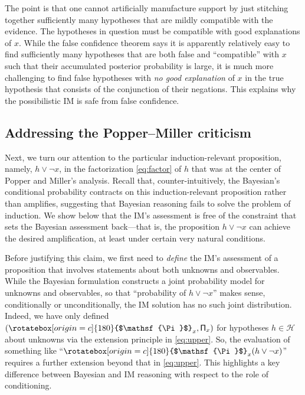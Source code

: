 \documentclass[a4paper, 12pt]{article}
\theoremstyle{plain}
\theoremstyle{definition}
\theoremstyle{remark}
\renewcommand{\H}{\mathcal{H}}
\newcommand{\lPi}{\rotatebox[origin=c]{180}{$\mathsf{\Pi}$}} %
\newcommand{\uPi}{\mathsf{\Pi}}%
\begin{document}
The point is that one cannot artificially manufacture support by just stitching together sufficiently many hypotheses that are mildly compatible with the evidence.  The hypotheses in question must be compatible with good explanations of $x$.  While the false confidence theorem says it is apparently relatively easy to find sufficiently many hypotheses that are both false and ``compatible'' with $x$ such that their accumulated posterior probability is large, it is much more challenging to find false hypotheses with {\em no good explanation} of $x$ in the true hypothesis that consists of the conjunction of their negations.  This explains why the possibilistic IM is safe from false confidence.  


\subsection{Addressing the Popper--Miller criticism}
\label{SS:pm}

Next, we turn our attention to the particular induction-relevant proposition, namely, $h \lor \neg x$, in the factorization \eqref{eq:factor} of $h$ that was at the center of Popper and Miller's analysis.  Recall that, counter-intuitively, the Bayesian's conditional probability contracts on this induction-relevant proposition rather than amplifies, suggesting that Bayesian reasoning fails to solve the problem of induction.  We show below that the IM's assessment is free of the constraint that sets the Bayesian assessment back---that is, the proposition $h \lor \neg x$ can achieve the desired amplification, at least under certain very natural conditions.  

Before justifying this claim, we first need to {\em define} the IM's assessment of a proposition that involves statements about both unknowns and observables.  While the Bayesian formulation constructs a joint probability model for unknowns and observables, so that ``probability of $h \lor \neg x$'' makes sense, conditionally or unconditionally, the IM solution has no such joint distribution.  Indeed, we have only defined $(\lPi_x, \uPi_x)$ for hypotheses $h \in \H$ about unknowns via the extension principle in \eqref{eq:upper}.  So, the evaluation of something like ``$\lPi_x(h \lor \neg x)$'' requires a further extension beyond that in \eqref{eq:upper}.  This highlights a key difference between Bayesian and IM reasoning with respect to the role of conditioning.  
\end{document}

